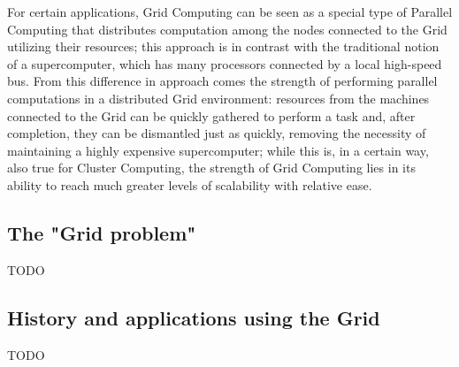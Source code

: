 For certain applications, Grid Computing can be seen as a special type of Parallel Computing that distributes computation among the nodes connected to the Grid utilizing their resources; this approach is in contrast with the traditional notion of a supercomputer, which has many processors connected by a local high-speed bus.
From this difference in approach comes the strength of performing parallel computations in a distributed Grid environment: resources from the machines connected to the Grid can be quickly gathered to perform a task and, after completion, they can be dismantled just as quickly, removing the necessity of maintaining a highly expensive supercomputer; while this is, in a certain way, also true for Cluster Computing, the strength of Grid Computing lies in its ability to reach much greater levels of scalability with relative ease. 

\subsection{The "Grid problem"}
TODO

\subsection{History and applications using the Grid}
TODO